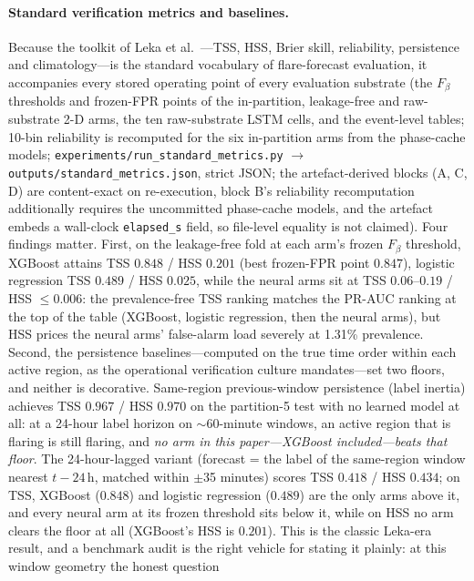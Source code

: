 \paragraph{Standard verification metrics and baselines.}
Because the toolkit of Leka et al.~\cite{leka2019}---TSS, HSS, Brier
skill, reliability, persistence and climatology---is the standard
vocabulary of flare-forecast evaluation, it accompanies every stored
operating point of every evaluation substrate (the $F_\beta$
thresholds and frozen-FPR points of the in-partition, leakage-free
and raw-substrate 2-D arms, the ten raw-substrate LSTM cells, and
the event-level tables; 10-bin reliability is recomputed for the six
in-partition arms from the phase-cache models;
\texttt{experiments/run\_standard\_metrics.py} $\to$
\texttt{outputs/standard\_metrics.json}, strict JSON; the
artefact-derived blocks (A, C, D) are content-exact on re-execution,
block B's reliability recomputation additionally requires the
uncommitted phase-cache models, and the artefact embeds a wall-clock
\texttt{elapsed\_s} field, so file-level equality is not claimed).
Four findings matter. First, on the leakage-free fold
at each arm's frozen $F_\beta$ threshold, XGBoost attains TSS
$0.848$ / HSS $0.201$ (best frozen-FPR point $0.847$), logistic
regression TSS $0.489$ / HSS $0.025$, while the
neural arms sit at TSS $0.06$--$0.19$ / HSS $\le 0.006$: the
prevalence-free TSS ranking matches the PR-AUC ranking at the top
of the table (XGBoost, logistic regression, then the neural arms),
but HSS
prices the neural arms' false-alarm load severely at 1.31\%
prevalence. Second, the persistence baselines---computed on the true
time order within each active region, as the operational
verification culture mandates---set two floors, and neither is
decorative. Same-region previous-window persistence (label inertia)
achieves TSS $0.967$ / HSS $0.970$ on the partition-5 test with no
learned model at all: at a 24-hour label horizon on $\sim$60-minute
windows, an active region that is flaring is still flaring, and
\emph{no arm in this paper---XGBoost included---beats that floor}.
The 24-hour-lagged variant (forecast = the label of the same-region
window nearest $t-24$\,h, matched within $\pm$35 minutes) scores TSS
$0.418$ / HSS $0.434$; on TSS, XGBoost ($0.848$) and logistic
regression ($0.489$) are the only arms above it, and every
neural arm at its frozen threshold sits below it, while on HSS no
arm clears the floor at all (XGBoost's HSS is $0.201$). This is the
classic Leka-era result, and a benchmark audit is the right vehicle
for stating it plainly: at this window geometry the honest question
